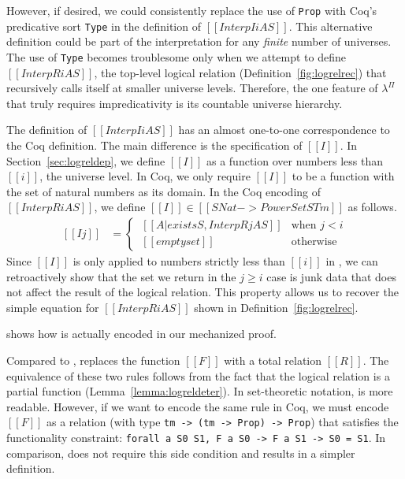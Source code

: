 \documentclass[\ifpublic nolinenum\else\fi,online,OA]{jfp}
\newcommand{\scw}[1]{}
\newcommand{\lang}{$\lambda^{\Pi}$\xspace}
\theoremstyle{definition}
\begin{document}

However, if desired, we could consistently replace the use of \texttt{Prop}
with Coq's predicative sort \texttt{Type} in the definition of
$[[Interp I i A S]]$. This alternative definition could be part of
the interpretation for any \emph{finite} number of universes. The use of
\texttt{Type} becomes troublesome only when we attempt to define
$[[InterpR i A S]]$, the top-level logical relation 
(Definition~\ref{fig:logrelrec}) that recursively calls itself at smaller universe
levels. Therefore, the one feature of \lang{} that truly requires
impredicativity is its countable universe hierarchy.

The definition of $[[Interp I i A S]]$ has an almost one-to-one
correspondence to the Coq definition. The main difference is the
specification of $[[I]]$. In
Section~\ref{sec:logreldep}, we define $[[I]]$ as a function over
numbers less than $[[i]]$, the universe level. In Coq, we only require
$[[I]]$ to be a function with the set of natural numbers as its domain.
In the Coq encoding of $[[InterpR i A S]]$, we define $[[I]] \in [[SNat -> PowerSet STm]]$ as follows.
\begin{equation*}
  \begin{split}
    [[I j]] &=
     \begin{cases}
      \ [[{A | exists S , InterpR j A S}]] & \text{when } j < i \\
      \ [[emptyset]] & \text{otherwise}
    \end{cases}
  \end{split}
\end{equation*}
Since $[[I]]$ is only applied to numbers strictly less than $[[i]]$ in
, we can retroactively show that the set we return in the $j
\geq i$ case is junk data that does not affect the result of the logical
relation. This property allows us to recover the simple equation for $[[InterpR i A S]]$ shown in Definition~\ref{fig:logrelrec}.

 shows how  is actually encoded in our
mechanized proof.
\begin{center}
\end{center}
Compared to ,  replaces the function
$[[F]]$ with a total relation $[[R]]$. The equivalence of these two
rules follows from the fact that the logical relation is a
partial function (Lemma~\ref{lemma:logreldeter}). In set-theoretic
notation,  is more readable. However, if we want to encode
the same rule in Coq, we must encode $[[F]]$ as a relation (with type
\texttt{tm -> (tm -> Prop) -> Prop}) that satisfies the functionality constraint:
\texttt{forall a S0 S1, F a S0 -> F a S1 -> S0 = S1}.
In comparison,  does not require this side condition and
results in a simpler definition.
\end{document}
